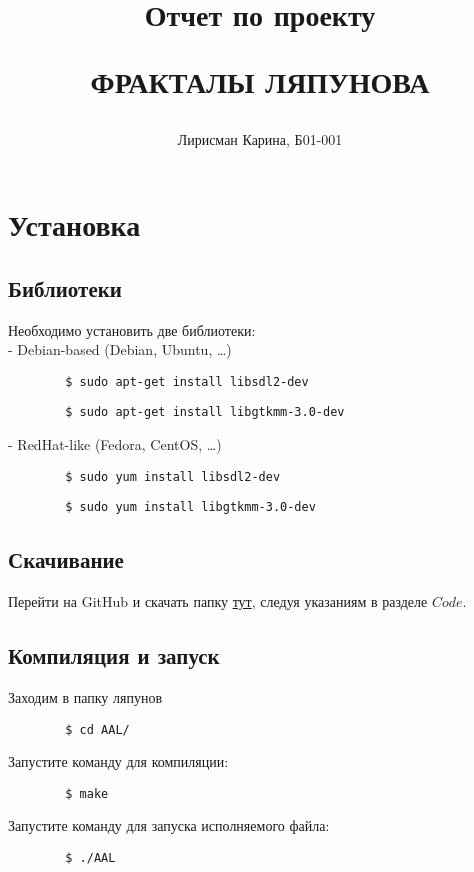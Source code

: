 \documentclass[a5paper,10pt, twoside]{article} %
\title
{
\hfill \break	\hfill \break
\hfill \break	\hfill \break
Отчет по проекту

ФРАКТАЛЫ ЛЯПУНОВА
}
\author{Лирисман Карина, Б01-001}
\begin{document}
\maketitle


\thispagestyle{empty} %

\newpage

\tableofcontents %
\thispagestyle{plain}
\newpage


\section{Установка}

  \subsection{Библиотеки}
    \noindent Необходимо установить две библиотеки: \\
	  - Debian-based (Debian, Ubuntu, \ldots)
	  \begin{lstlisting}
	  	$ sudo apt-get install libsdl2-dev 
	  \end{lstlisting}
	  \begin{lstlisting}
	  	$ sudo apt-get install libgtkmm-3.0-dev 
	  \end{lstlisting}
	  - RedHat-like (Fedora, CentOS, \ldots)
	  \begin{lstlisting}
	  	$ sudo yum install libsdl2-dev 
	  \end{lstlisting}
	  \begin{lstlisting}
	  	$ sudo yum install libgtkmm-3.0-dev 
	  \end{lstlisting}

  \subsection{Скачивание}
    Перейти на GitHub и скачать папку \href{https://github.com/TheRedHotHabanero/AAL}{тут}, следуя указаниям в разделе $Code$.

  \subsection{Компиляция и запуск}
    \noindent Заходим в папку ляпунов
	  \begin{lstlisting}
	  	$ cd AAL/ 
	  \end{lstlisting}
	  Запустите команду для компиляции:
	  \begin{lstlisting}
	  	$ make 
	  \end{lstlisting}
	  Запустите команду для запуска исполняемого файла:
	  \begin{lstlisting}
	  	$ ./AAL 
	  \end{lstlisting}
\end{document}
